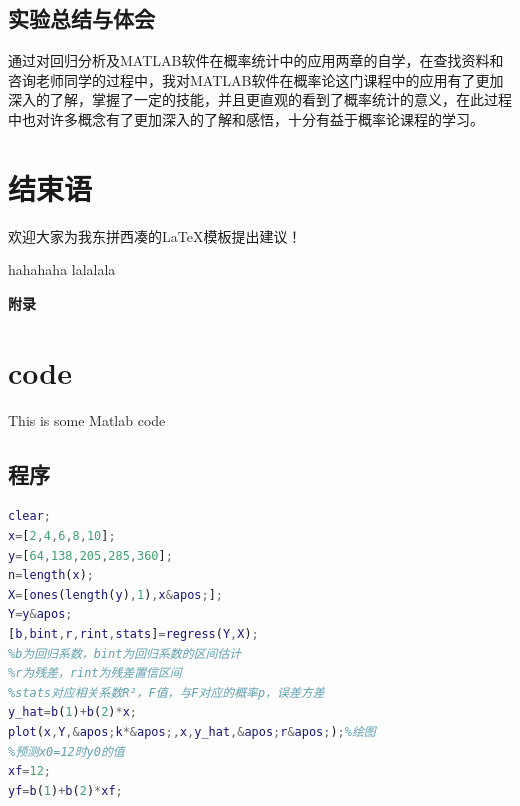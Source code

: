 \documentclass[UTF8,12pt,a4paper]{article}
\begin{document}
\subsection{实验总结与体会}
通过对回归分析及MATLAB软件在概率统计中的应用两章的自学，在查找资料和咨询老师同学的过程中，我对MATLAB软件在概率论这门课程中的应用有了更加深入的了解，掌握了一定的技能，并且更直观的看到了概率统计的意义，在此过程中也对许多概念有了更加深入的了解和感悟，十分有益于概率论课程的学习。



\section{结束语}
欢迎大家为我东拼西凑的\LaTeX 模板提出建议！


\begin{thebibliography}{2}
	 hahahaha
	 lalalala
\end{thebibliography}
%
%



\appendix
\addappheadtotoc%

\newpage

\begin{center}
	\Huge\bfseries\heiti 附录 %
\end{center}

\section{code}

This is some Matlab code
\subsection{程序}
\begin{lstlisting}[language={Matlab},morekeywords={regress}]
clear;
x=[2,4,6,8,10];
y=[64,138,205,285,360];
n=length(x);
X=[ones(length(y),1),x&apos;];
Y=y&apos;
[b,bint,r,rint,stats]=regress(Y,X);
%b为回归系数，bint为回归系数的区间估计
%r为残差，rint为残差置信区间
%stats对应相关系数R²，F值，与F对应的概率p，误差方差
y_hat=b(1)+b(2)*x;
plot(x,Y,&apos;k*&apos;,x,y_hat,&apos;r&apos;);%绘图
%预测x0=12时y0的值
xf=12;
yf=b(1)+b(2)*xf;
\end{lstlisting}


%
\end{document}
